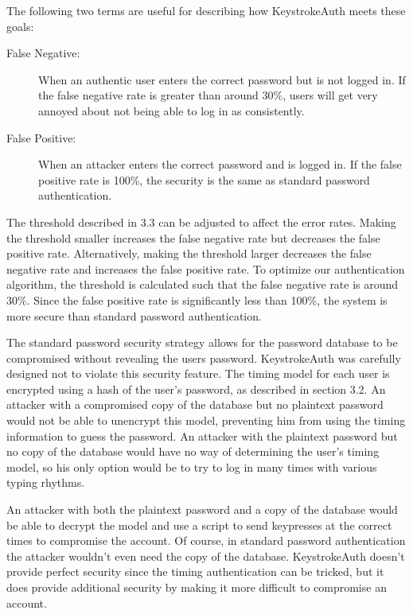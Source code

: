 \documentclass{article}
\begin{document}
The following two terms are useful for describing how KeystrokeAuth meets these goals:

\begin{description}
  \item[False Negative:] When an authentic user enters the correct password but is not logged in. If the false negative rate is greater than around 30\%, users will get very annoyed about not being able to log in as consistently.
  \item[False Positive:] When an attacker enters the correct password and is logged in. If the false positive rate is 100\%, the security is the same as standard password authentication.
\end{description}

The threshold described in 3.3 can be adjusted to affect the error rates. 
Making the threshold smaller increases the false negative rate but decreases the false positive rate.
Alternatively, making the threshold larger decreases the false negative rate and increases the false positive rate. 
To optimize our authentication algorithm, the threshold is calculated such that the false negative rate is around 30\%.
Since the false positive rate is significantly less than 100\%, the system is more secure than standard password authentication.

The standard password security strategy allows for the password database to be compromised without revealing the users password.
KeystrokeAuth was carefully designed not to violate this security feature.
The timing model for each user is encrypted using a hash of the user's password, as described in section 3.2. 
An attacker with a compromised copy of the database but no plaintext password would not be able to unencrypt this model, preventing him from using the timing information to guess the password.
An attacker with the plaintext password but no copy of the database would have no way of determining the user's timing model, so his only option would be to try to log in many times with various typing rhythms. 

An attacker with both the plaintext password and a copy of the database would be able to decrypt the model and use a script to send keypresses at the correct times to compromise the account. 
Of course, in standard password authentication the attacker wouldn't even need the copy of the database.
KeystrokeAuth doesn't provide perfect security since the timing authentication can be tricked, but it does provide additional security by making it more difficult to compromise an account.
\end{document}
